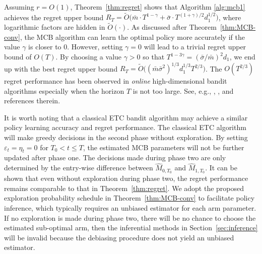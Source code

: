 \documentclass[12pt]{article}
\newcommand{\blue}[1]{{\color{blue}#1}}
\def\hat{\widehat}
\def\eps{\varepsilon}
\def\tilde{\widetilde}
\theoremstyle{plain}
\begin{document}
Assuming $r=O(1)$, Theorem~\ref{thm:regret} shows that Algorithm \ref{alg:mcb1} achieves the regret upper bound $R_T=\tilde{O}\big( \bar m\cdot T^{1-\gamma}+\bar\sigma\cdot T^{(1+\gamma)/2}d_1^{1/2}\big)$, where logarithmic factors are hidden in $\tilde O(\cdot)$.  As discussed after Theorem~\ref{thm:MCB-conv}, the MCB algorithm can learn the optimal policy more accurately if the value $\gamma$ is closer to $0$.  However, setting $\gamma=0$ will lead to a trivial regret upper bound of $O(T)$. 
By choosing a value $\gamma>0$ so that $T^{1-3\gamma} = (\bar\sigma/\bar m)^2d_1$, we end up with the best regret upper bound $R_T = \tilde O\big((\bar m\bar \sigma^2)^{1/3}d_1^{1/3}T^{2/3}\big)$. 
The $O(T^{2/3})$ regret performance has been observed in \emph{online} high-dimensional bandit algorithms especially when the horizon $T$ is not too large. See, e.g., \cite{hao2020high}, \cite{ma2023high},  and references therein. 



It is worth noting that a classical ETC bandit algorithm may achieve a similar policy learning accuracy and regret performance. The classical ETC algorithm will make greedy decisions in the second phase without exploration. By setting $\eps_t=\eta_t=0$ for $T_0<t\leq T$, the estimated MCB parameters will not be further updated after phase one. The decisions made during phase two are only determined by the entry-wise difference between $\hat M_{0, T_0}$ and $\hat M_{1, T_0}$. It can be shown that even without exploration during phase two, the regret performance remains comparable to that in Theorem~\ref{thm:regret}. We adopt the proposed exploration probability schedule in Theorem~\ref{thm:MCB-conv} to facilitate policy inference, which typically requires an unbiased estimator for each arm parameter. If no exploration is made during phase two, there will be no chance to choose the estimated sub-optimal arm, then the inferential methods in Section~\ref{sec:inference} will be invalid because the debiasing procedure does not yield an unbiased estimator. 
\end{document}
